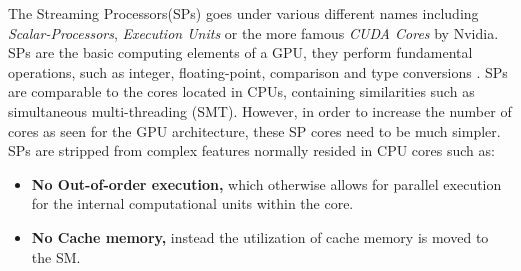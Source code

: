 The Streaming Processors(SPs) goes under various different names including \textit{Scalar-Processors}, \textit{Execution Units} or the more famous \textit{CUDA Cores} by Nvidia.
SPs are the basic computing elements of a GPU, they perform fundamental operations, such as integer, floating-point, comparison and type conversions \cite{Li2016}.
SPs are comparable to the cores located in CPUs, containing similarities such as simultaneous multi-threading (SMT).
However, in order to increase the number of cores as seen for the GPU architecture, these SP cores need to be much simpler.
SPs are stripped from complex features normally resided in CPU cores such as:

\begin{itemize}
	\item \textbf{No Out-of-order execution,} which otherwise allows for parallel execution for the internal computational units within the core. 
	\item \textbf{No Cache memory,} instead the utilization of cache memory is moved to the SM. 
\end{itemize}

